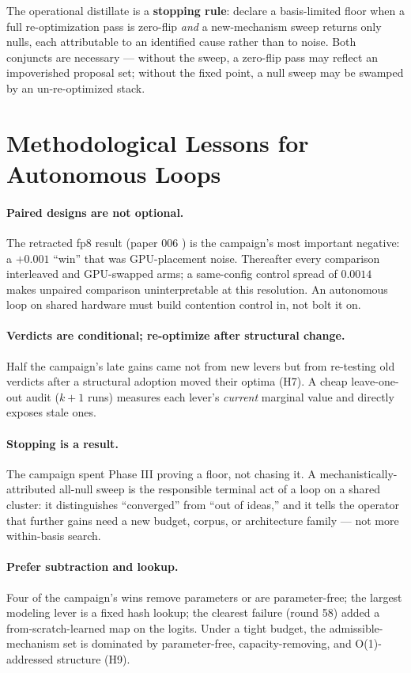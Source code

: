 \documentclass{article}
\begin{document}
The operational distillate is a \textbf{stopping rule}: declare a basis-limited floor when a full re-optimization pass is zero-flip \emph{and} a new-mechanism sweep returns only nulls, each attributable to an identified cause rather than to noise. Both conjuncts are necessary --- without the sweep, a zero-flip pass may reflect an impoverished proposal set; without the fixed point, a null sweep may be swamped by an un-re-optimized stack.

\section{Methodological Lessons for Autonomous Loops}
\label{sec:methods}

\paragraph{Paired designs are not optional.} The retracted fp8 result (paper 006 \cite{ophis2026retraction}) is the campaign's most important negative: a $+0.001$ ``win'' that was GPU-placement noise. Thereafter every comparison interleaved and GPU-swapped arms; a same-config control spread of $0.0014$ makes unpaired comparison uninterpretable at this resolution. An autonomous loop on shared hardware must build contention control in, not bolt it on.

\paragraph{Verdicts are conditional; re-optimize after structural change.} Half the campaign's late gains came not from new levers but from re-testing old verdicts after a structural adoption moved their optima (H7). A cheap leave-one-out audit ($k{+}1$ runs) measures each lever's \emph{current} marginal value and directly exposes stale ones.

\paragraph{Stopping is a result.} The campaign spent Phase III proving a floor, not chasing it. A mechanistically-attributed all-null sweep is the responsible terminal act of a loop on a shared cluster: it distinguishes ``converged'' from ``out of ideas,'' and it tells the operator that further gains need a new budget, corpus, or architecture family --- not more within-basis search.

\paragraph{Prefer subtraction and lookup.} Four of the campaign's wins remove parameters or are parameter-free; the largest modeling lever is a fixed hash lookup; the clearest failure (round 58) added a from-scratch-learned map on the logits. Under a tight budget, the admissible-mechanism set is dominated by parameter-free, capacity-removing, and O(1)-addressed structure (H9).
\end{document}

